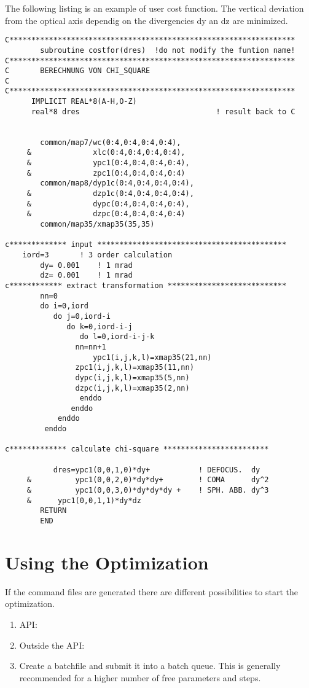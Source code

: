 The following listing is an example of user cost function. 
The vertical deviation from the optical axis
dependig on the divergencies dy an dz are minimized.
\begin{small}
\begin{verbatim}
C*****************************************************************
        subroutine costfor(dres)  !do not modify the funtion name!
C*****************************************************************
C       BERECHNUNG VON CHI_SQUARE
C
C*****************************************************************
      IMPLICIT REAL*8(A-H,O-Z)
      real*8 dres                               ! result back to C     

      
        common/map7/wc(0:4,0:4,0:4,0:4),
     &              xlc(0:4,0:4,0:4,0:4),
     &              ypc1(0:4,0:4,0:4,0:4),
     &              zpc1(0:4,0:4,0:4,0:4)
        common/map8/dyp1c(0:4,0:4,0:4,0:4),
     &              dzp1c(0:4,0:4,0:4,0:4),
     &              dypc(0:4,0:4,0:4,0:4),
     &              dzpc(0:4,0:4,0:4,0:4)
        common/map35/xmap35(35,35)

c************* input *******************************************
	iord=3       ! 3 order calculation
        dy= 0.001    ! 1 mrad
        dz= 0.001    ! 1 mrad
c************ extract transformation ***************************
        nn=0
        do i=0,iord
           do j=0,iord-i
              do k=0,iord-i-j
                 do l=0,iord-i-j-k
	            nn=nn+1
                    ypc1(i,j,k,l)=xmap35(21,nn)
         	    zpc1(i,j,k,l)=xmap35(11,nn)
         	    dypc(i,j,k,l)=xmap35(5,nn)
         	    dzpc(i,j,k,l)=xmap35(2,nn)
                 enddo
               enddo        
       	    enddo
       	 enddo        

c************* calculate chi-square ************************

           dres=ypc1(0,0,1,0)*dy+     	    ! DEFOCUS.  dy
     &	        ypc1(0,0,2,0)*dy*dy+        ! COMA      dy^2
     &	        ypc1(0,0,3,0)*dy*dy*dy +    ! SPH. ABB. dy^3
     &		ypc1(0,0,1,1)*dy*dz                   
        RETURN
        END

\end{verbatim}   
\end{small}

\section{Using the Optimization}
If the command files are generated there are different possibilities
to start the optimization.
\begin {enumerate} 
\item  \phase API: 
\item Outside the API:   
\item Create a batchfile and submit it into a batch queue. This is generally 
recommended for a higher number of free parameters and steps.  
\end {enumerate}       

